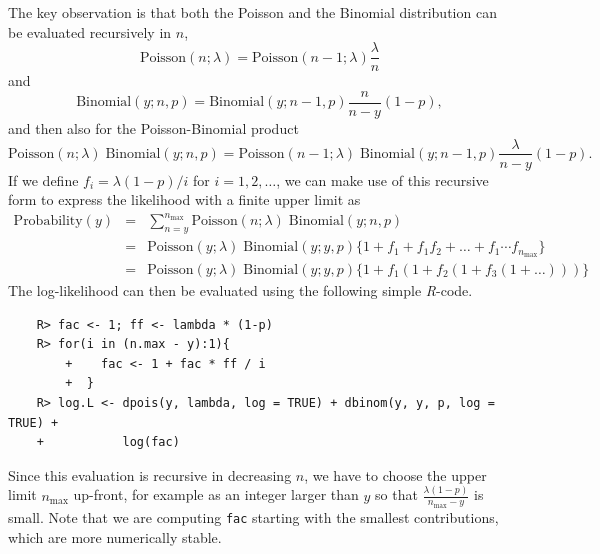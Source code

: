 \documentclass{article}
\begin{document}
The key observation is that both the Poisson and the Binomial distribution can be evaluated recursively in $n$,
\begin{displaymath}
\text{Poisson}(n; \lambda) = \text{Poisson}(n-1; \lambda) \frac{\lambda}{n}
\end{displaymath}
and
\begin{displaymath}
\text{Binomial}(y; n, p) = \text{Binomial}(y; n-1, p) \frac{n}{n-y}(1-p),
\end{displaymath}
and then also for the Poisson-Binomial product
\begin{displaymath}
\text{Poisson}(n ; \lambda) \; \text{Binomial}(y;  n, p)
=
\text{Poisson}(n-1; \lambda) \; \text{Binomial}(y; n-1, p)
\frac{\lambda}{n-y}(1-p).
\end{displaymath}
If we define $f_i = \lambda(1-p)/i$ for $i=1, 2, \ldots$, we can make use of this recursive form to express the likelihood with a finite upper limit as
\begin{eqnarray}
\text{Probability}(y) &=& \sum_{n = y}^{n_{\text{max}}}
\text{Poisson}(n ; \lambda)\;
\text{Binomial}(y;  n, p) \nonumber\\
&=& \text{Poisson}(y; \lambda)\; \text{Binomial}(y; y, p)
\Big\{ 1 + f_1 + f_1f_2 +
\ldots
+f_1\cdots f_{n_\text{max}}
\Big\} \nonumber\\
&=& \text{Poisson}(y; \lambda)\; \text{Binomial}(y; y, p)
\Big\{ 1 + f_1(1+f_2(1+f_3(1+ \dots)))\Big\}\nonumber
\end{eqnarray}
The log-likelihood can then be evaluated using the following simple \emph{R}-code.
\begin{verbatim}
	R> fac <- 1; ff <- lambda * (1-p)
	R> for(i in (n.max - y):1){
		+    fac <- 1 + fac * ff / i
		+  } 
	R> log.L <- dpois(y, lambda, log = TRUE) + dbinom(y, y, p, log = TRUE) + 
	+           log(fac)
\end{verbatim}
Since this evaluation is recursive in decreasing $n$, we have to choose the upper limit $n_\text{max}$ up-front, for example as an integer larger than $y$ so that $\frac{\lambda (1-p)}{n_\text{max}-y}$ is small. Note that we are computing \texttt{fac} starting with the smallest contributions, which are more numerically stable.
\end{document}
